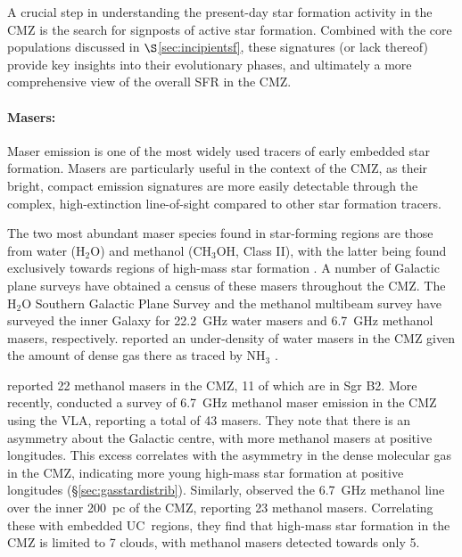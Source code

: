 A crucial step in understanding the present-day star formation activity in the CMZ is the search for signposts of active star formation. Combined with the core populations discussed in $\S$\ref{sec:incipientsf}, these signatures (or lack thereof) provide key insights into their evolutionary phases, and ultimately a more comprehensive view of the overall SFR in the CMZ.

\paragraph{Masers:}\label{sec:masers} Maser emission is one of the most widely used tracers of early embedded star formation. Masers are particularly useful in the context of the CMZ, as their bright, compact emission signatures are more easily detectable through the complex, high-extinction line-of-sight compared to other star formation tracers. 

The two most abundant maser species found in star-forming regions are those from water (H$_{2}$O) and methanol (CH$_{3}$OH, Class II), with the latter being found exclusively towards regions of high-mass star formation \citep[e.g.][]{Ellingsen2006}. A number of Galactic plane surveys have obtained a census of these masers throughout the CMZ. The H$_{2}$O Southern Galactic Plane Survey \citep[HOPS,][]{Walsh2011} and the methanol multibeam survey \citep[MMB,][]{Green2009, Caswell2010} have surveyed the inner Galaxy for 22.2~GHz water masers and 6.7~GHz methanol masers, respectively. \citet{Walsh2011} reported an under-density of water masers in the CMZ given the amount of dense gas there as traced by NH$_{3}$ \citep{Longmore2013b}. 

\citet{Caswell2010} reported 22 methanol masers in the CMZ, 11 of which are in Sgr B2. More recently, \citet{Rickert2019} conducted a survey of 6.7~GHz methanol maser emission in the CMZ using the VLA, reporting a total of 43 masers. They note that there is an asymmetry about the Galactic centre, with more methanol masers at positive longitudes. This excess correlates with the asymmetry in the dense molecular gas in the CMZ, indicating more young high-mass star formation at positive longitudes (\S\ref{sec:gasstardistrib}). Similarly, \citet{Lu2019a} observed the 6.7~GHz methanol line over the inner 200~pc of the CMZ, reporting 23 methanol masers. Correlating these with embedded UC\hii\ regions, they find that high-mass star formation in the CMZ is limited to 7 clouds, with methanol masers detected towards only 5.
    
